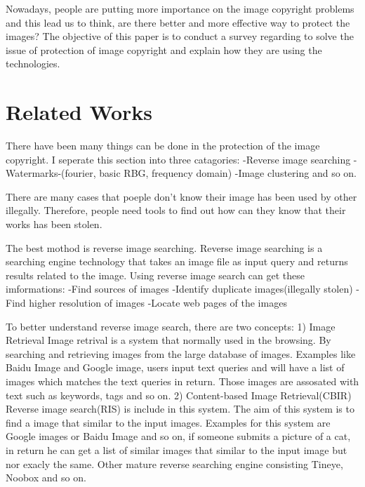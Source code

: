 Nowadays, people are putting more importance on the image copyright problems and this lead us to think,
are there better and more effective way to protect the images?
The objective of this paper is to conduct a survey regarding to solve the issue of protection of image copyright and explain how they are using the technologies.

\section{Related Works}
There have been many things can be done in the protection of the image copyright. 
I seperate this section into three catagories: 
-Reverse image searching
-Watermarks-(fourier, basic RBG, frequency domain)
-Image clustering and so on.

There are many cases that poeple don't know their image has been used by other illegally.
Therefore, people need tools to find out how can they know that their works has been stolen.

The best mothod is reverse image searching.
Reverse image searching is a searching engine technology that takes an image file as input query and returns results related to the image.%
Using reverse image search can get these imformations: %
-Find sources of images
-Identify duplicate images(illegally stolen)
-Find higher resolution of images
-Locate web pages of the images

To better understand reverse image search, there are two concepts:
1) Image Retrieval
Image retrival is a system that normally used in the browsing.
By searching and retrieving images from the large database of images.
Examples like Baidu Image and Google image, users input text queries and will have a list of images which matches the text queries in return.
Those images are assosated with text such as keywords, tags and so on.
2) Content-based Image Retrieval(CBIR)
Reverse image search(RIS) is include in this system.
The aim of this system is to find a image that similar to the input images.
Examples for this system are Google images or Baidu Image and so on,
if someone submits a picture of a cat, in return he can get a list of similar images that similar to the input image but nor exacly the same.
Other mature reverse searching engine consisting Tineye, Noobox and so on.

